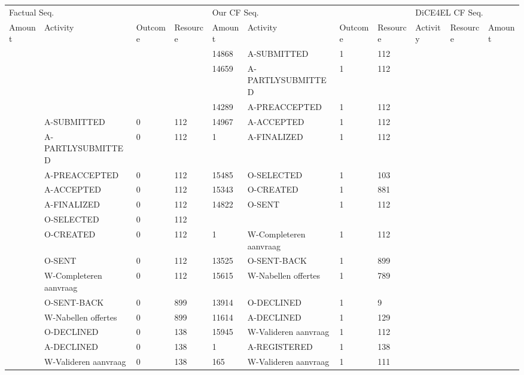 \begin{tabular}{lllllllllll}
\toprule
\multicolumn{4}{l}{Factual Seq.} & \multicolumn{4}{l}{Our CF Seq.} & \multicolumn{3}{l}{DiCE4EL CF Seq.} \\
Amount & Activity & Outcome & Resource & Amount & Activity & Outcome & Resource & Activity & Resource & Amount \\
\midrule
 &  &  &  & 14868 & A-SUBMITTED & 1 & 112 &  &  &  \\
 &  &  &  & 14659 & A-PARTLYSUBMITTED & 1 & 112 &  &  &  \\
 &  &  &  & 14289 & A-PREACCEPTED & 1 & 112 &  &  &  \\
 & A-SUBMITTED & 0 & 112 & 14967 & A-ACCEPTED & 1 & 112 &  &  &  \\
 & A-PARTLYSUBMITTED & 0 & 112 & 1 & A-FINALIZED & 1 & 112 &  &  &  \\
 & A-PREACCEPTED & 0 & 112 & 15485 & O-SELECTED & 1 & 103 &  &  &  \\
 & A-ACCEPTED & 0 & 112 & 15343 & O-CREATED & 1 & 881 &  &  &  \\
 & A-FINALIZED & 0 & 112 & 14822 & O-SENT & 1 & 112 &  &  &  \\
 & O-SELECTED & 0 & 112 &  &  &  &  &  &  &  \\
 & O-CREATED & 0 & 112 & 1 & W-Completeren aanvraag & 1 & 112 &  &  &  \\
 & O-SENT & 0 & 112 & 13525 & O-SENT-BACK & 1 & 899 &  &  &  \\
 & W-Completeren aanvraag & 0 & 112 & 15615 & W-Nabellen offertes & 1 & 789 &  &  &  \\
 & O-SENT-BACK & 0 & 899 & 13914 & O-DECLINED & 1 & 9 &  &  &  \\
 & W-Nabellen offertes & 0 & 899 & 11614 & A-DECLINED & 1 & 129 &  &  &  \\
 & O-DECLINED & 0 & 138 & 15945 & W-Valideren aanvraag & 1 & 112 &  &  &  \\
 & A-DECLINED & 0 & 138 & 1 & A-REGISTERED & 1 & 138 &  &  &  \\
 & W-Valideren aanvraag & 0 & 138 & 165 & W-Valideren aanvraag & 1 & 111 &  &  &  \\
\bottomrule
\end{tabular}

